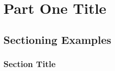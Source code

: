 

\part{Part One Title}


\chapterspaceabove{6.75cm} %
\chapterspacebelow{7.25cm} %



\chapter{Sectioning Examples}


\section{Section Title}

